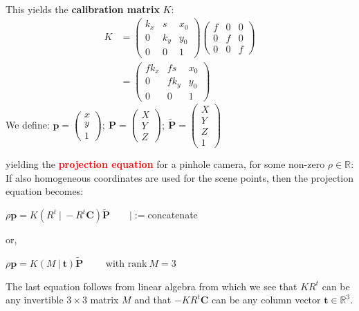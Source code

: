 \documentclass[a4paper, fontsize=8pt, landscape, DIV=1]{scrartcl}
\begin{document}
\begin{multicols*}{4}
\begin{align*}
		\end{align*}
		This yields the \textbf{calibration matrix} $K$:
		\begin{align*}
			K&=\begin{pmatrix}k_x&s&x_0\\0&k_y&y_0\\0&0&1\end{pmatrix}\begin{pmatrix}f&0&0\\0&f&0\\0&0&f\end{pmatrix}\\
			 &=\begin{pmatrix}fk_x&fs&x_0\\0&fk_y&y_0\\0&0&1\end{pmatrix}
		\end{align*}
		We define: $\mathbf{p}=\begin{pmatrix}x\\y\\1\end{pmatrix};\ \mathbf{P}=\begin{pmatrix}X\\Y\\Z\end{pmatrix};\ 
					\mathbf{\tilde{P}}=\begin{pmatrix}X\\Y\\Z\\1\end{pmatrix}$
		\par 
		yielding the \textcolor{red}{\textbf{projection equation}} for a pinhole camera, for some non-zero $\rho\in\mathbb{R}$: 
		\ceqbox{\rho\mathbf{p}=KR^t\left(\mathbf{P}-\mathbf{C}\right)}
		If also homogeneous coordinates are used for the scene points, then the projection equation becomes: 
		\par 
		\hspace{0.3cm}$\rho\mathbf{p}=K\left(R^t\ \vert\ -R^t\mathbf{C}\right)\mathbf{\tilde{P}}\qquad\vert:=$concatenate
		\par 
		or,
		\par 
		\hspace{0.3cm}$\rho\mathbf{p}=K\left(M\ \vert\ \mathbf{t}\right)\mathbf{\tilde{P}}\qquad$ with $\text{rank} \ M = 3$
		\par 
		The last equation follows from linear algebra from which we see that $KR^t$ can be any invertible $3\times3$ matrix $M$
		and that $-KR^t\mathbf{C}$ can be any column vector $\mathbf{t}\in\mathbb{R}^3$.
		\par 
		

\end{multicols*}
\end{document}
